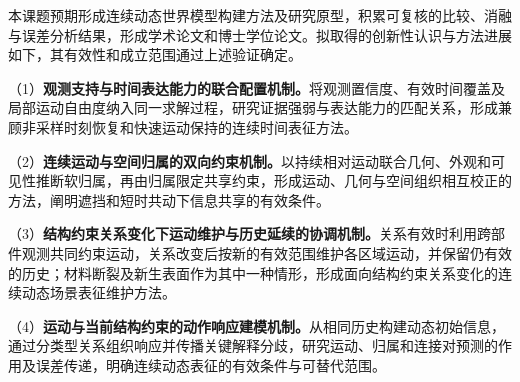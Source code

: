 本课题预期形成连续动态世界模型构建方法及研究原型，积累可复核的比较、消融与误差分析结果，形成学术论文和博士学位论文。拟取得的创新性认识与方法进展如下，其有效性和成立范围通过上述验证确定。

（1）\textbf{观测支持与时间表达能力的联合配置机制。}将观测置信度、有效时间覆盖及局部运动自由度纳入同一求解过程，研究证据强弱与表达能力的匹配关系，形成兼顾非采样时刻恢复和快速运动保持的连续时间表征方法。

（2）\textbf{连续运动与空间归属的双向约束机制。}以持续相对运动联合几何、外观和可见性推断软归属，再由归属限定共享约束，形成运动、几何与空间组织相互校正的方法，阐明遮挡和短时共动下信息共享的有效条件。

（3）\textbf{结构约束关系变化下运动维护与历史延续的协调机制。}关系有效时利用跨部件观测共同约束运动，关系改变后按新的有效范围维护各区域运动，并保留仍有效的历史；材料断裂及新生表面作为其中一种情形，形成面向结构约束关系变化的连续动态场景表征维护方法。

（4）\textbf{运动与当前结构约束的动作响应建模机制。}从相同历史构建动态初始信息，通过分类型关系组织响应并传播关键解释分歧，研究运动、归属和连接对预测的作用及误差传递，明确连续动态表征的有效条件与可替代范围。
